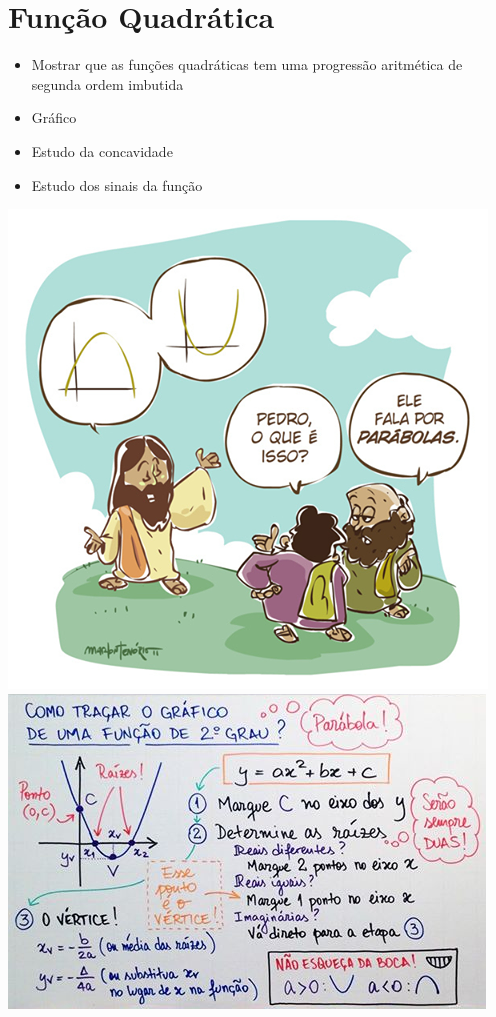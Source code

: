 \chapter{Função Quadrática}



\begin{itemize}
 \item Mostrar que as funções quadráticas tem uma progressão aritmética de segunda ordem imbutida
 \item Gráfico
 \item Estudo da concavidade
 \item Estudo dos sinais da função
\end{itemize}

\begin{center}
\includegraphics[scale=.5]{./imagens/25.png}
\includegraphics[scale=1]{./imagens/30.png}
\end{center}


